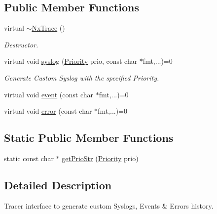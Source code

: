 \subsection*{Public Member Functions}
\begin{DoxyCompactItemize}
\item 
\hypertarget{classnxos_1_1NxTrace_a4b8ef9990a168effbca47f29d9b6ea9d}{
virtual \hyperlink{classnxos_1_1NxTrace_a4b8ef9990a168effbca47f29d9b6ea9d}{$\sim$NxTrace} ()}
\label{classnxos_1_1NxTrace_a4b8ef9990a168effbca47f29d9b6ea9d}

\begin{DoxyCompactList}\small\item\em Destructor. \item\end{DoxyCompactList}\item 
\hypertarget{classnxos_1_1NxTrace_a825db76787da234b99e81adb2def8d3d}{
virtual void \hyperlink{classnxos_1_1NxTrace_a825db76787da234b99e81adb2def8d3d}{syslog} (\hyperlink{classnxos_1_1NxTrace_a582f6e5a22e788c61807657f8bca088f}{Priority} prio, const char $\ast$fmt,...)=0}
\label{classnxos_1_1NxTrace_a825db76787da234b99e81adb2def8d3d}

\begin{DoxyCompactList}\small\item\em Generate Custom Syslog with the specified Priority. \item\end{DoxyCompactList}\item 
virtual void \hyperlink{classnxos_1_1NxTrace_a22e5e2fff39fae68fba3051dc2720621}{event} (const char $\ast$fmt,...)=0
\item 
virtual void \hyperlink{classnxos_1_1NxTrace_afc0240b6b9a291729836ffb2fbeef8a4}{error} (const char $\ast$fmt,...)=0
\end{DoxyCompactItemize}
\subsection*{Static Public Member Functions}
\begin{DoxyCompactItemize}
\item 
static const char $\ast$ \hyperlink{classnxos_1_1NxTrace_a583b8a49a2111e4e4b8ef2f2eeaa4620}{getPrioStr} (\hyperlink{classnxos_1_1NxTrace_a582f6e5a22e788c61807657f8bca088f}{Priority} prio)
\end{DoxyCompactItemize}


\subsection{Detailed Description}
Tracer interface to generate custom Syslogs, Events \& Errors history. 

